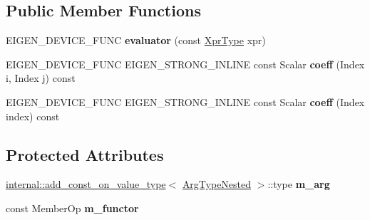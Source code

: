 \subsection*{Public Member Functions}
\begin{DoxyCompactItemize}
\item 
\mbox{\label{struct_eigen_1_1internal_1_1evaluator_3_01_partial_redux_expr_3_01_arg_type_00_01_member_op_00_01_direction_01_4_01_4_aeef6a0e1c9868969a6e019c4d6f7d7b8}} 
E\+I\+G\+E\+N\+\_\+\+D\+E\+V\+I\+C\+E\+\_\+\+F\+U\+NC {\bfseries evaluator} (const \mbox{\hyperlink{class_eigen_1_1_partial_redux_expr}{Xpr\+Type}} xpr)
\item 
\mbox{\label{struct_eigen_1_1internal_1_1evaluator_3_01_partial_redux_expr_3_01_arg_type_00_01_member_op_00_01_direction_01_4_01_4_a9436b5cbe9815a7a80d3222cd40fb8d7}} 
E\+I\+G\+E\+N\+\_\+\+D\+E\+V\+I\+C\+E\+\_\+\+F\+U\+NC E\+I\+G\+E\+N\+\_\+\+S\+T\+R\+O\+N\+G\+\_\+\+I\+N\+L\+I\+NE const Scalar {\bfseries coeff} (Index i, Index j) const
\item 
\mbox{\label{struct_eigen_1_1internal_1_1evaluator_3_01_partial_redux_expr_3_01_arg_type_00_01_member_op_00_01_direction_01_4_01_4_a5fe727d25f7814f608d734f57d8511a4}} 
E\+I\+G\+E\+N\+\_\+\+D\+E\+V\+I\+C\+E\+\_\+\+F\+U\+NC E\+I\+G\+E\+N\+\_\+\+S\+T\+R\+O\+N\+G\+\_\+\+I\+N\+L\+I\+NE const Scalar {\bfseries coeff} (Index index) const
\end{DoxyCompactItemize}
\subsection*{Protected Attributes}
\begin{DoxyCompactItemize}
\item 
\mbox{\label{struct_eigen_1_1internal_1_1evaluator_3_01_partial_redux_expr_3_01_arg_type_00_01_member_op_00_01_direction_01_4_01_4_adda440d44fd10ae949464c465596744c}} 
\mbox{\hyperlink{struct_eigen_1_1internal_1_1add__const__on__value__type}{internal\+::add\+\_\+const\+\_\+on\+\_\+value\+\_\+type}}$<$ \mbox{\hyperlink{struct_eigen_1_1internal_1_1true__type}{Arg\+Type\+Nested}} $>$\+::type {\bfseries m\+\_\+arg}
\item 
\mbox{\label{struct_eigen_1_1internal_1_1evaluator_3_01_partial_redux_expr_3_01_arg_type_00_01_member_op_00_01_direction_01_4_01_4_aa4d55dc703ff6c2bfb2074ce2fc3c4ac}} 
const Member\+Op {\bfseries m\+\_\+functor}
\end{DoxyCompactItemize}


